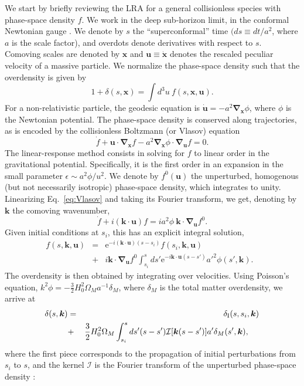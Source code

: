 \documentclass[useAMS, usenatbib]{mnras}
\newcommand{\beq}{\begin{equation}}
\newcommand{\eeq}{\end{equation}}
\newcommand{\barr}{\begin{eqnarray}}
\newcommand{\earr}{\end{eqnarray}}
\newcommand{\rme}{\textrm{e}}
\newcommand{\bs}{\boldsymbol}
\begin{document}
We start by briefly reviewing the LRA for a general collisionless species with phase-space density $f$. We work in the deep sub-horizon limit, in the conformal Newtonian gauge \citep{Ma_1995}. We denote by $s$ the ``superconformal'' time $(ds \equiv dt/a^2$, where $a$ is the scale factor), and overdots denote derivatives with respect to $s$. Comoving scales are denoted by $\bs{x}$ and $\bs{u} \equiv \dot{\bs{x}}$ denotes the rescaled peculiar velocity of a massive particle. We normalize the phase-space density such that the overdensity is given by
\beq
1 + \delta(s, \bs{x}) = \int d^3 u ~ f(s, \bs{x}, \bs{u}).
\eeq
For a non-relativistic particle, the geodesic equation is $\dot{\bs{u}} = - a^2  \bs{\nabla}_{\bs{x}} \phi$, where $\phi$ is the Newtonian potential. The phase-space density is conserved along trajectories, as is encoded by the collisionless Boltzmann (or Vlasov) equation
\beq
\dot{f} + \bs{u} \cdot \bs{\nabla}_{\bs{x}} f - a^2 \bs{\nabla}_{\bs{x}} \phi \cdot \bs{\nabla}_{\bs{u}} f = 0. \label{eq:Vlasov}
\eeq
The linear-response method consists in solving for $f$ to linear order in the gravitational potential. Specifically, it is the first order in an expansion in the small parameter $\epsilon \sim a^2 \phi/u^2$. We denote by $f^0(\bs{u})$ the unperturbed, homogenous (but not necessarily isotropic) phase-space density, which integrates to unity. Linearizing Eq.~\eqref{eq:Vlasov} and taking its Fourier transform, we get, denoting by $\bs{k}$ the comoving wavenumber,
\beq
\dot{f} + i (\bs{k} \cdot \bs{u}) f = i a^2 \phi ~ \bs{k} \cdot \bs{\nabla}_{\bs{u}} f^0. \label{eq:Boltz-Fourier}
\eeq
Given initial conditions at $s_i$, this has an explicit integral solution,
\barr
f(s, \bs{k}, \bs{u}) &=& \rme^{- i(\bs{k} \cdot \bs{u}) (s - s_i)} f(s_i, \bs{k}, \bs{u}) \nonumber\\
&+& i \bs{k} \cdot \bs{\nabla}_{\bs{u}} f^0 \int_{s_i}^s d s' \rme^{- i \bs{k} \cdot \bs{u} (s - s')} a'^2 \phi(s', \bs{k}).~~~
\earr
The overdensity is then obtained by integrating over velocities. Using Poisson's equation, $k^2 \phi = - \frac32 H_0^2 \Omega_M a^{-1} \delta_M$, where $\delta_M$ is the total matter overdensity, we arrive at
\barr
\delta(s, \bs{k}) &=& \delta_{\rm I}(s,s_i, \bs{k})\nonumber\\
&+& \frac32 H_0^2 \Omega_M \int_{s_i}^s d s' (s-s') \mathcal{I}[\bs{k}(s-s')] a' \delta_M(s', \bs{k}), ~~~~\label{eq:delta-phi}
\earr
where the first piece corresponds to the propagation of initial perturbations from $s_i$ to $s$, and the kernel $\mathcal{I}$ is the Fourier transform of the unperturbed phase-space density \citep{Brandenberger_1987, Bertschinger_Watts_1988}:
\end{document}
